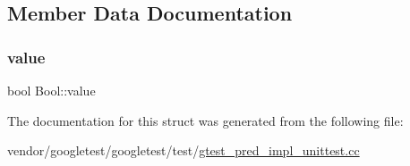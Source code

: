 \subsection{Member Data Documentation}
\mbox{\label{struct_bool_a16be863c269f988cdcbe59f9d846a141}} 
\subsubsection{\texorpdfstring{value}{value}}
{\footnotesize\ttfamily bool Bool\+::value}



The documentation for this struct was generated from the following file\+:\begin{DoxyCompactItemize}
\item 
vendor/googletest/googletest/test/\hyperlink{gtest__pred__impl__unittest_8cc}{gtest\+\_\+pred\+\_\+impl\+\_\+unittest.\+cc}\end{DoxyCompactItemize}
